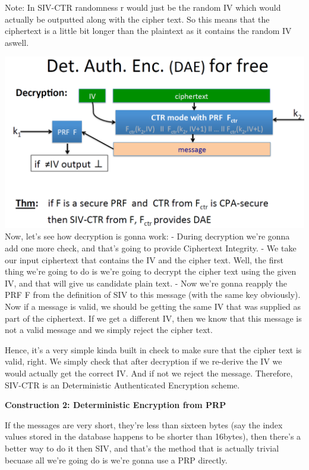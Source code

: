 \documentclass[11pt]{article}
\makeatletter
\def\maxwidth{\ifdim\Gin@nat@width>\linewidth\linewidth
    \else\Gin@nat@width\fi}
\let\Oldincludegraphics\includegraphics
\renewcommand{\includegraphics}[1]{\Oldincludegraphics[width=.8\maxwidth]{#1}}
\makeatother
\begin{document}
Note: In SIV-CTR randomness r would just be the random IV which would
actually be outputted along with the cipher text. So this means that the
ciphertext is a little bit longer than the plaintext as it contains the
random IV aswell.

\includegraphics{./Images/SIV-DAE.png} Now, let's see how decryption is
gonna work: - During decryption we're gonna add one more check, and
that's going to provide Ciphertext Integrity. - We take our input
ciphertext that contains the IV and the cipher text. Well, the first
thing we're going to do is we're going to decrypt the cipher text using
the given IV, and that will give us candidate plain text. - Now we're
gonna reapply the PRF F from the definition of SIV to this message (with
the same key obviously). Now if a message is valid, we should be getting
the same IV that was supplied as part of the ciphertext. If we get a
different IV, then we know that this message is not a valid message and
we simply reject the cipher text.

Hence, it's a very simple kinda built in check to make sure that the
cipher text is valid, right. We simply check that after decryption if we
re-derive the IV we would actually get the correct IV. And if not we
reject the message. Therefore, SIV-CTR is an Deterministic Authenticated
Encryption scheme.

\textbf{Construction 2: Deterministic Encryption from PRP}

If the messages are very short, they're less than sixteen bytes (say the
index values stored in the database happens to be shorter than 16bytes),
then there's a better way to do it then SIV, and that's the method that
is actually trivial becuase all we're going do is we're gonna use a PRP
directly.
\end{document}
